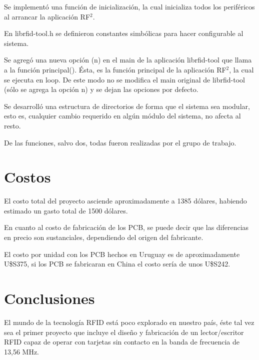 \documentclass[%
        final,
        notitlepage,
        narroweqnarray,
        inline,
        ]{ieee}
\begin{document}
\newpage
{}

Se implementó una función de inicialización, la cual inicializa todos los periféricos al arrancar la aplicación RF$^{2}$.

En librfid-tool.h se definieron constantes simbólicas para hacer configurable al sistema. 

Se agregó una nueva opción (n) en el main de la aplicación librfid-tool que llama a la función principal(). Ésta, es la función principal de la aplicación RF$^{2}$, la cual se ejecuta en loop.
De este modo no se modifica el main original de librfid-tool (sólo se agrega la opción n) y se dejan las opciones por defecto.

\bigskip
{}

Se desarrolló una estructura de directorios de forma que el sistema sea modular, esto es, cualquier cambio requerido en algún módulo del sistema, no afecta al resto.

De las funciones, salvo dos, todas fueron realizadas por el grupo de trabajo.


\section{Costos}

El costo total del proyecto asciende aproximadamente a 1385 dólares, habiendo 
estimado un gasto total de 1500 dólares.

En cuanto al costo de fabricación de los PCB, se puede decir
que las diferencias en precio son sustanciales, dependiendo
del origen del fabricante. 

El costo por unidad con los PCB hechos en Uruguay es de aproximadamente U\$S375, si los PCB se fabricaran en China el costo sería de unos U\$S242.



\section{Conclusiones}
El mundo de la tecnología RFID está poco explorado en nuestro país, éste 
tal vez sea el primer proyecto que incluye el diseño y fabricación de un 
lector/escritor RFID capaz de operar con tarjetas sin contacto en la banda de
frecuencia de 13,56 MHz.
\end{document}
